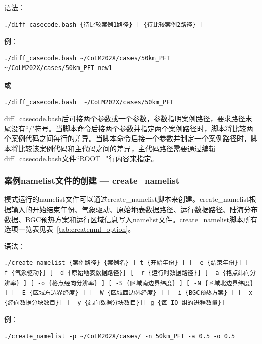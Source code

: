 语法：

\begin{lstlisting}[xleftmargin=2.5em]
./diff_casecode.bash {待比较案例1路径} [ {待比较案例2路径} ]
\end{lstlisting}

例：
\begin{lstlisting}[xleftmargin=2.5em]
./diff_casecode.bash ~/CoLM202X/cases/50km_PFT ~/CoLM202X/cases/50km_PFT-new1
\end{lstlisting}
或
\begin{lstlisting}[xleftmargin=2.5em]
./diff_casecode.bash  ~/CoLM202X/cases/50km_PFT
\end{lstlisting}

diff\_casecode.bash后可接两个参数或一个参数，参数指明案例路径，要求路径末尾没有``/"符号。当脚本命令后接两个参数并指定两个案例路径时，脚本将比较两个案例代码之间每行的差异。当脚本命令后接一个参数并制定一个案例路径时，脚本将比较该案例代码和主代码之间的差异，主代码路径需要通过编辑diff\_casecode.bash文件``ROOT="行内容来指定。

\subsubsection{案例namelist文件的创建 --- create\_namelist}

模式运行的namelist文件可以通过create\_namelist脚本来创建。create\_namelist根据输入的开始结束年份、气象驱动、原始地表数据路径、运行数据路径、陆海分布数据、BGC预热方案和运行区域信息写入namelist文件。create\_namelist脚本所有选项一览表见表~\ref{tab:createnml_option}。

语法：
\begin{lstlisting}[xleftmargin=2.5em]
./create_namelist {案例路径} {案例名} [-t {开始年份} ] [ -e {结束年份}] [ -f {气象驱动}] [ -d {原始地表数据路径}] [ -r {运行时数据路径}] [ -a {格点纬向分辨率} ] [ -o {格点经向分辨率} ] [ -S {区域南边界纬度} ] [ -N {区域北边界纬度} ] [ -E {区域东边界经度} ] [ -W {区域西边界经度} ] [ -i {BGC预热方案} ] [ -x {经向数据分块数目}] [ -y {纬向数据分块数目}][-g {每 IO 组的进程数量}]
\end{lstlisting}

例：
\begin{lstlisting}[xleftmargin=2.5em]
./create_namelist -p ~/CoLM202X/cases/ -n 50km_PFT -a 0.5 -o 0.5
\end{lstlisting}

